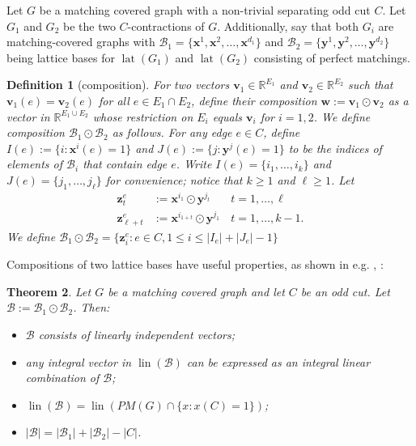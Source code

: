 \documentclass[11pt]{article}
\DeclareMathOperator{\lat}{lat}
\DeclareMathOperator{\lin}{lin}
\newcommand{\1}{\mathbf{1}}
\newcommand{\0}{\mathbf{0}}
\newcommand{\zB}{\mathcal B}
\newcommand{\R}{\mathbb{R}}
\newtheorem{theorem}{Theorem}[section]
\newtheorem{DE}[theorem]{Definition}
\begin{document}
Let $G$ be a matching covered graph with a non-trivial separating odd cut $C$. Let $G_1$ and $G_2$ be the two $C$-contractions of $G$. Additionally, say that both $G_i$ are matching-covered graphs with $\zB_1=\{\mathbf{x}^1,\mathbf{x}^2,\ldots, \mathbf{x}^{d_1}\}$ and $\zB_2=\{\mathbf{y}^1,\mathbf{y}^2,\ldots, \mathbf{y}^{d_2}\}$ being lattice bases for $\lat(G_1)$ and $\lat(G_2)$ consisting of perfect matchings. 
\begin{DE}[composition]
    For two vectors $\mathbf{v}_1 \in \R^{E_1}$ and $\mathbf{v}_2\in \R^{E_2}$ such that $\mathbf{v}_1(e) = \mathbf{v}_2(e)$ for all $e \in E_1\cap E_2$, define their \emph{composition} $\mathbf{w}:=\mathbf{v}_1\odot \mathbf{v}_2$ as a vector in $\R^{E_1\cup E_2}$ whose restriction on $E_i$ equals $\mathbf{v}_i$ for $i=1,2$. We define \emph{composition} $\zB_1\odot \zB_2$ as follows. For any edge $e \in C$, define $I(e):=\{i: \mathbf{x}^i(e) = 1\}$ and $J(e):=\{j: \mathbf{y}^j(e)=1\}$ to be the indices of elements of $\zB_i$ that contain edge $e$. Write $I(e) = \{i_1,\ldots,i_k\}$ and $J(e) = \{j_1,\ldots,j_\ell\}$ for convenience; notice that $k\geq 1$ and $\ell \geq 1$. Let \begin{align*}
            \mathbf{z}^e_t&:=\mathbf{x}^{i_1} \odot \mathbf{y}^{j_t} \quad &t=1,\ldots,\ell\\
            \mathbf{z}^e_{\ell+t}&:=\mathbf{x}^{i_{1+t}}\odot \mathbf{y}^{j_1}  &t=1,\ldots,k-1.
        \end{align*} 
    We define $\zB_1 \odot \zB_2 = \{\mathbf{z}^e_i:e\in C, 1\leq i\leq |I_e|+|J_e|-1\}$
\end{DE}
Compositions of two lattice bases have useful properties, as shown in e.g. \cite{abdi2025integralbasepm}, \cite{abdi2024str}:
\begin{theorem}\label{thm:basis-comb}
    Let $G$ be a matching covered graph and let $C$ be an odd cut.
    Let $\zB:=\zB_1\odot \zB_2$. Then: \begin{itemize}
        \item[(i)]  $\zB$ consists of linearly independent vectors;
        \item [(ii)] any integral vector in $\lin(\zB)$ can be expressed as an integral linear combination of $\zB$;
        \item [(iii)]$\lin(\zB) = \lin(PM(G)\cap \{x: x(C)=1\})$;
        \item[(iv)] $|\zB|=|\zB_1|+|\zB_2|-|C|$.
    \end{itemize}
\end{theorem}
\end{document}
